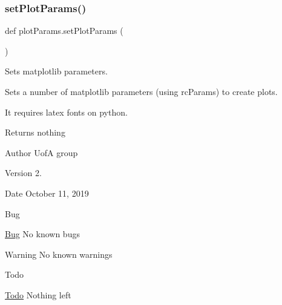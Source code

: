 \subsubsection{\texorpdfstring{setPlotParams()}{setPlotParams()}}
{\footnotesize\ttfamily def plot\+Params.\+set\+Plot\+Params (\begin{DoxyParamCaption}{ }\end{DoxyParamCaption})}



Sets matplotlib parameters. 

Sets a number of matplotlib parameters (using rc\+Params) to create plots.

It requires latex fonts on python.

\begin{DoxyReturn}{Returns}
nothing
\end{DoxyReturn}
\begin{DoxyAuthor}{Author}
UofA group
\end{DoxyAuthor}
\begin{DoxyVersion}{Version}
2.
\end{DoxyVersion}
\begin{DoxyDate}{Date}
October 11, 2019
\end{DoxyDate}
\begin{DoxyRefDesc}{Bug}
\item[\mbox{\hyperlink{bug__bug000009}{Bug}}]No known bugs\end{DoxyRefDesc}


\begin{DoxyWarning}{Warning}
No known warnings
\end{DoxyWarning}
\begin{DoxyRefDesc}{Todo}
\item[\mbox{\hyperlink{todo__todo000009}{Todo}}]Nothing left \end{DoxyRefDesc}
